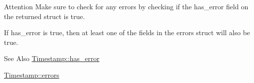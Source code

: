 \begin{DoxyAttention}{Attention}
Make sure to check for any errors by checking if the {\ttfamily has\-\_\-error} field on the returned struct is true.
\end{DoxyAttention}
If {\ttfamily has\-\_\-error} is true, then at least one of the fields in the {\ttfamily errors} struct will also be true.

\begin{DoxySeeAlso}{See Also}
\hyperlink{structTimestamp_a7e49819ae41a46b5cae479d9ddbc3bdf}{Timestamp\-::has\-\_\-error} 

\hyperlink{structTimestamp_abafff530b3a467c1dcc27b780f89d0a0}{Timestamp\-::errors} 
\end{DoxySeeAlso}
